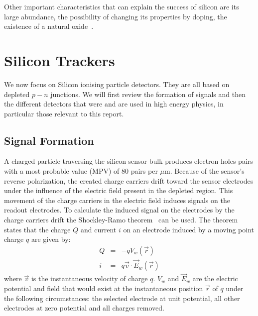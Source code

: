 Other important characteristics that can explain the success of silicon are its large abundance, 
the possibility of changing its properties by doping, the existence of a natural oxide~\cite{Hartmann2012}.

\section{Silicon Trackers}
\label{sec:Trackers}
We now focus on Silicon ionising particle detectors. They are all based on depleted $p-n$ junctions.  
We will first review the formation of signals and then the different detectors that were and are used 
in high energy physics, in particular those relevant to this report.

\subsection{Signal Formation}
\label{sec:SigForm}

A charged particle traversing the silicon sensor bulk produces electron holes pairs with a most 
probable value (MPV) of 80 pairs per $\mu$m. Because of the sensor's reverse
polarization, the created charge carriers drift toward the sensor electrodes under the influence of
the electric field present in the depleted region. This movement of the charge carriers in the electric 
field induces signals on the readout electrodes.
To calculate the induced signal on the electrodes by the charge carriers drift the Shockley-Ramo 
theorem~\cite{ShockleyPot,Ramo,HE2001250} can be used.
The theorem states that the charge $Q$ and current $i$ on an electrode induced by a moving point 
charge $q$ are given by:
\begin{eqnarray}
Q &=&-qV_{w}(\vec{r})\\ 
i &=&q\vec{v}\cdot\vec{E}_{w}(\vec{r}) 
\end{eqnarray}
where $\vec{v}$ is the instantaneous velocity of charge $q$. $V_{w}$ and $\vec{E}_{w}$ are the 
electric potential and field that would exist at the instantaneous position $\vec{r}$ of $q$ under the 
following circumstances: the selected electrode at unit potential, all other electrodes at zero potential 
and all charges removed.

